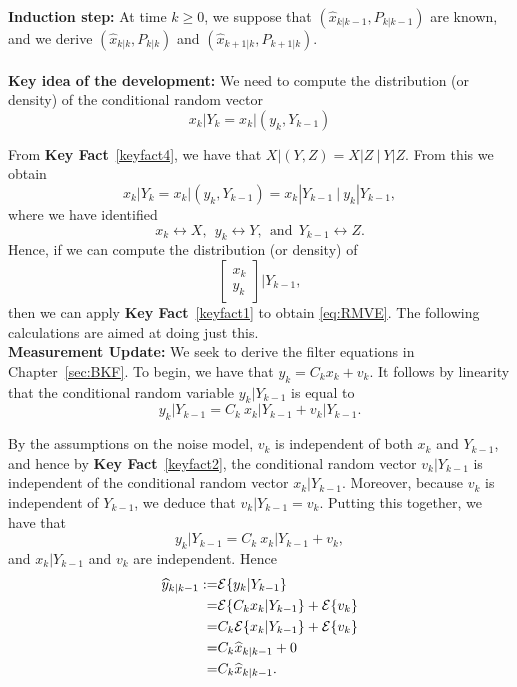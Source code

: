 \textbf{Induction step:} At time $k\ge0$, we suppose that $(\widehat{x}_{k|k-1}, P_{k|k-1})$ are known, and we derive $(\widehat{x}_{k|k}, P_{k|k})$ and $(\widehat{x}_{k+1|k}, P_{k+1|k})$.\\ \\

\textbf{Key idea of the development:} We need to compute the distribution (or density) of the conditional random vector
$$x_k | Y_k = x_k | (y_k, Y_{k-1}) $$

From \textbf{Key Fact}~\ref{keyfact4}, we have that $ X |(Y,Z) = X|Z ~\Big|~ Y|Z$. From this we obtain
\begin{equation}
\label{eq:RMVE}
    x_k | Y_k = x_k | (y_k, Y_{k-1}) = x_k | Y_{k-1} ~\Big\rvert~ y_k | Y_{k-1},
\end{equation}
 where we have identified
 $$x_k \leftrightarrow X,~~y_k \leftrightarrow Y ,~~\text{and}~~ Y_{k-1} \leftrightarrow Z.$$
 Hence, if we can compute the distribution (or density) of
 $$\left[\begin{array}{c}x_k \\ y_k\end{array} \right] \Big| {Y_{k-1}}, $$
 then we can apply \textbf{Key Fact}~\ref{keyfact1} to obtain \eqref{eq:RMVE}. The following calculations are aimed at doing just this.\\



 \textbf{Measurement Update:}  We seek to derive the filter equations in Chapter~\ref{sec:BKF}. To begin, we have that $y_k = C_k x_k + v_k$. It follows by linearity that the conditional random variable $y_k | Y_{k-1}$ is equal to
$$y_k|Y_{k-1} = C_k ~x_k|Y_{k-1} + v_k|Y_{k-1}.$$

By the assumptions on the noise model, $v_k$ is independent of both $x_k$ and $Y_{k-1}$, and hence by \textbf{Key Fact}~\ref{keyfact2}, the conditional random vector $v_k|Y_{k-1}$ is independent of the conditional random vector $x_k|Y_{k-1}$. Moreover, because $v_k$ is independent of $Y_{k-1}$, we deduce that  $v_k|Y_{k-1} =v_k$. Putting this together, we have that
$$y_k|Y_{k-1} = C_k ~x_k|Y_{k-1} + v_k,$$
and $x_k|Y_{k-1}$ and $v_k$ are independent. Hence
\begin{align*}
\widehat{y}_{k|k-1}:=& {\cal E} \{ y_k|Y_{k-1} \} \\
=& {\cal E} \{ C_k x_k|Y_{k-1} \} + {\cal E} \{ v_k \} \\
=& C_k{\cal E} \{  x_k|Y_{k-1} \} + {\cal E} \{ v_k \} \\
=&C_k \widehat{x}_{k|k-1} + 0\\
=&C_k \widehat{x}_{k|k-1}.
\end{align*}

